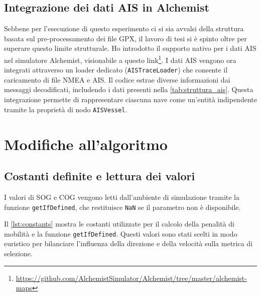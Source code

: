 
	


\newpage

\subsection{Integrazione dei dati AIS in Alchemist}
\label{sec:integrazione_dati_AIS_alchemist}

Sebbene per l'esecuzione di questo esperimento ci si sia avvalsi della struttura basata sul pre-processamento dei file \ac{GPX}, il lavoro di tesi si è spinto oltre per superare questo limite strutturale. Ho introdotto il supporto nativo per i dati \ac{AIS} nel simulatore Alchemist, visionabile a questo link\footnote{\url{https://github.com/AlchemistSimulator/Alchemist/tree/master/alchemist-maps}}. I dati \ac{AIS} vengono ora integrati attraverso un loader dedicato (\texttt{AISTraceLoader}) che consente il caricamento di file NMEA e \ac{AIS}. Il codice estrae diverse informazioni dai messaggi decodificati, includendo i dati presenti nella \cref{tab:struttura_ais}. Questa integrazione permette di rappresentare ciascuna nave come un'entità indipendente tramite la proprietà di nodo \texttt{AISVessel}.

\section{Modifiche all’algoritmo}
\label{sec:modifiche_algoritmo}

\subsection{Costanti definite e lettura dei valori}
\label{sec:costanti_lettura_valori}

I valori di \ac{SOG} e \ac{COG} vengono letti dall'ambiente di simulazione tramite la funzione \texttt{getIfDefined}, che restituisce \texttt{NaN} se il parametro non è disponibile.

Il \cref{lst:constants} mostra le costanti utilizzate per il calcolo della penalità di mobilità e la funzione \texttt{getIfDefined}. Questi valori sono stati scelti in modo euristico per bilanciare l'influenza della direzione e della velocità sulla metrica di selezione.

